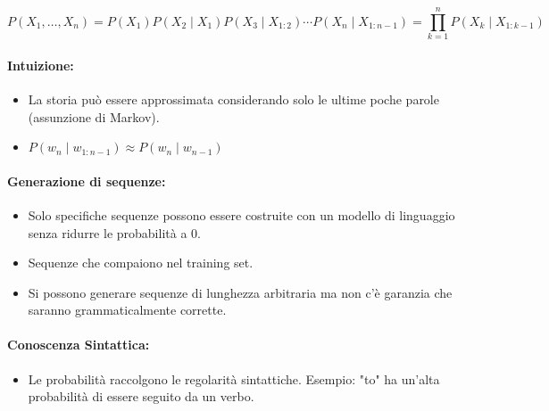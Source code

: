 $$
P(X_1, \ldots, X_n) = P(X_1)P(X_2 \mid X_1)P(X_3 \mid X_{1:2}) \cdots P(X_n \mid X_{1:n-1}) = \prod_{k=1}^{n} P(X_k \mid X_{1:k-1})
$$


\paragraph{Intuizione:} 

\begin{itemize}
  \item La storia può essere approssimata considerando solo le ultime poche parole (assunzione di Markov). 
  \item $P(w_n \mid w_{1:n-1}) \approx P(w_n \mid w_{n-1})$
\end{itemize}



\paragraph{Generazione di sequenze:}

\begin{itemize}
  \item Solo specifiche sequenze possono essere costruite con un modello di linguaggio senza ridurre le probabilità a 0. 
  \item Sequenze che compaiono nel training set. 
  \item Si possono generare sequenze di lunghezza arbitraria ma non c'è garanzia che saranno grammaticalmente corrette.
\end{itemize}


\paragraph{Conoscenza Sintattica:}

\begin{itemize}
  \item Le probabilità  raccolgono le regolarità sintattiche. Esempio: "to" ha un'alta probabilità di essere seguito da un verbo. 
\end{itemize}

